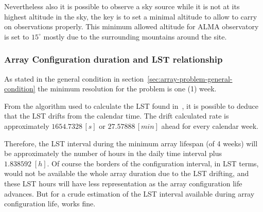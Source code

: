 \begin{description}
Nevertheless also it is possible to observe a sky source while it is not at its highest altitude in the sky, the key is to set a minimal altitude to allow to carry on observations properly. This minimum allowed altitude for ALMA observatory is set to $15^\circ$ mostly due to the surrounding mountains around the site. 

\subsubsection{Array Configuration duration and LST relationship}
As stated in the general condition in section~\ref{sec:array-problem-general-condition} the minimum resolution for the problem is one (1) week.

From the algorithm used to calculate the LST found in~\cite{kaplan05}, it is possible to deduce that the LST drifts from the calendar time. The drift calculated rate is approximately $1654.7328\,[s]$ or $27.57888\,[min]$ ahead for every calendar week.

Therefore, the LST interval during the minimum array lifespan (of 4 weeks) will be approximately the number of hours in the daily time interval plus $1.838592\;[h]$.
Of course the borders of the configuration interval, in LST terms, would not be available the whole array duration due to the LST drifting, and these LST hours will have less representation as the array configuration life advances. But for a crude estimation of the LST interval available during array configuration life, works fine.

\end{description}
